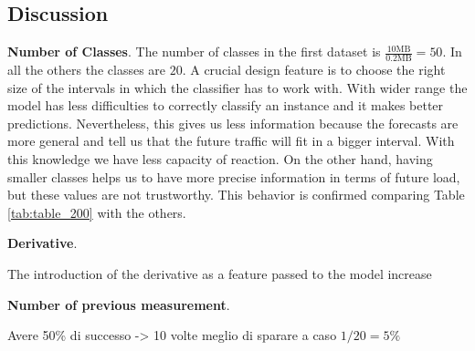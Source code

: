 \documentclass[12pt]{article}
\begin{document}
\begin{table}[h!]
	\centering
	\caption{Results for \textbf{500\_D\_10}}
	\label{tab:table_500D10}
\end{table}

\restoregeometry


\subsection{Discussion}


\hspace{14pt} \textbf{Number of Classes}. 
The number of classes in the first dataset is $ \frac{10 \text{MB} } { 0.2 \text{MB}}  = 50$. 
In all the others the classes are $20$. 
A crucial design feature is to choose the right size of the intervals in which the classifier has to work with.
With wider range the model has less difficulties to correctly classify an instance and it makes better predictions. 
Nevertheless, this gives us less information because the forecasts are more general and tell us that the future traffic will fit in a bigger interval. With this knowledge we have less capacity of reaction. 
On the other hand, having smaller classes helps us to have more precise information in terms of future load, but these values are not trustworthy.
This behavior is confirmed comparing Table \ref{tab:table_200} with the others.

\textbf{Derivative}.

The introduction of the derivative as a feature passed to the model increase 

\textbf{Number of previous measurement}.

Avere 50\% di successo -> 10 volte meglio di sparare a caso $1/20 = 5\%$

\printbibliography 

	
\end{document}
